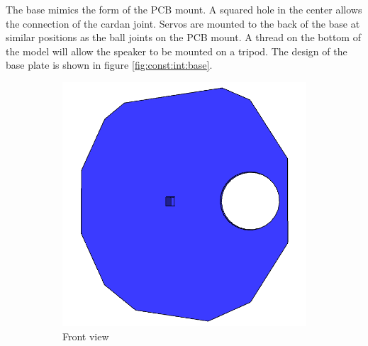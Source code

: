 The base mimics the form of the PCB mount. A squared hole in the center allows the connection of the cardan joint. Servos are mounted to the back of the base at similar positions as the ball joints on the PCB mount. A thread on the bottom of the model will allow the speaker to be mounted on a tripod. The design of the base plate is shown in figure \ref{fig:const:int:base}.
%
\begin{figure}[ht]
  \centering
  \begin{subfigure}{0.59\textwidth}
    \includegraphics[width=\textwidth]{src/assets/pictures/construction/base_plate_front.png}
    \caption{Front view}
    \label{fig:const:int:base_front}
  \end{subfigure}
  \\
  \begin{subfigure}{0.6\textwidth}

\end{subfigure}
\end{figure}
